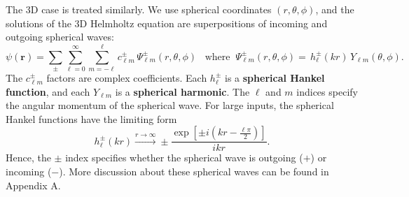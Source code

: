 \documentclass[pra,12pt]{revtex4}
\begin{document}
The 3D case is treated similarly.  We use spherical coordinates
$(r,\theta,\phi)$, and the solutions of the 3D Helmholtz equation are
superpositions of incoming and outgoing spherical waves:
\begin{equation}
  \psi(\mathbf{r})=\sum_{\pm}\sum_{\ell=0}^\infty\sum_{m=-\ell}^\ell c_{\ell m}^\pm \,\Psi_{\ell m}^\pm(r,\theta,\phi)\;\;\;\mathrm{where}\;\;\Psi_{\ell m}^\pm(r,\theta,\phi) = \,h_\ell^\pm(kr)\,Y_{\ell m}(\theta,\phi).
\end{equation}
The $c_{\ell m}^\pm$ factors are complex coefficients.  Each
$h_\ell^\pm$ is a \textbf{spherical Hankel function}, and each
$Y_{\ell m}$ is a \textbf{spherical harmonic}.  The $\ell$ and $m$
indices specify the angular momentum of the spherical wave.  For large
inputs, the spherical Hankel functions have the limiting form
\begin{equation}
  h_\ell^\pm(kr) \overset{r\rightarrow\infty}{\longrightarrow} \pm \frac{\exp\!\left[\pm i\!\left(kr-\frac{\ell\pi}{2}\right)\right]}{ikr}.
\end{equation}
Hence, the $\pm$ index specifies whether the spherical wave is
outgoing ($+$) or incoming ($-$).  More discussion about these
spherical waves can be found in Appendix A.
\end{document}
